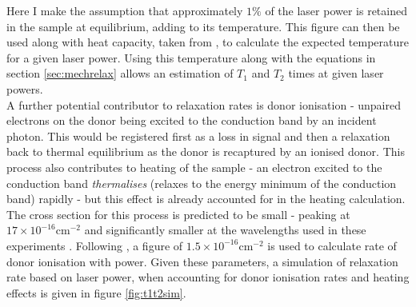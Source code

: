 Here I make the assumption that approximately $1\%$ of the laser power is retained in the sample at equilibrium, adding to its temperature.
This figure can then be used along with heat capacity, taken from \cite{Desai1986,Glazov2001}, to calculate the expected temperature for a given laser power.
Using this temperature along with the equations in section \ref{sec:mechrelax} allows an estimation of $T_1$ and $T_2$ times at given laser powers.
\\
A further potential contributor to relaxation rates is donor ionisation - unpaired electrons on the donor being excited to the conduction band by an incident photon.
This would be registered first as a loss in signal and then a relaxation back to thermal equilibrium as the donor is recaptured by an ionised donor.
This process also contributes to heating of the sample - an electron excited to the conduction band \emph{thermalises} (relaxes to the energy minimum of the conduction band) rapidly - but this effect is already accounted for in the heating calculation.
The cross section for this process is predicted to be small - peaking at $17\times10^{-16}\text{cm}^{-2}$ and significantly smaller at the wavelengths used in these experiments \cite{Sclar1984,Ross2017a}. 
Following \cite{Ross2017a}, a figure of $1.5\times10^{-16}\text{cm}^{-2}$ is used to calculate rate of donor ionisation with power.
Given these parameters, a simulation of relaxation rate based on laser power, when accounting for donor ionisation rates and heating effects is given in figure \ref{fig:t1t2sim}.

